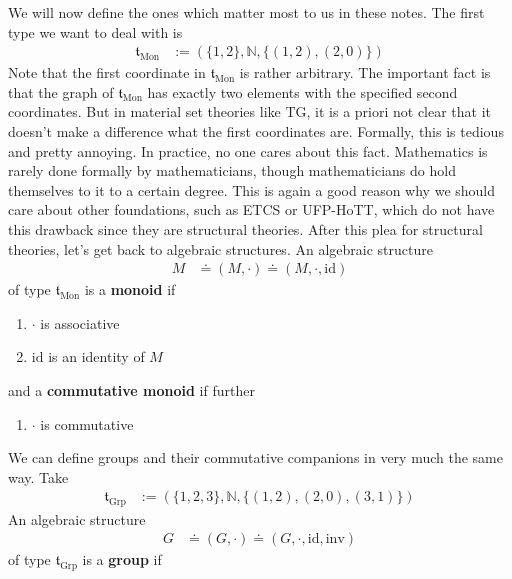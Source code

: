 \begin{exa}
We will now define the ones which matter most to us in these notes.
The first type we want to deal with is
\begin{align*}
  \mathfrak{t}_{\textrm{Mon}}
  &:=
  \left(
    \lbrace
      1,
      2
    \rbrace,
    \mathbb{N},
    \lbrace
      (1,2),
      (2,0)
    \rbrace
  \right)
\end{align*}
Note that the first coordinate in $\mathfrak{t}_{\textrm{Mon}}$ is rather arbitrary.
The important fact is that the graph of $\mathfrak{t}_{\textrm{Mon}}$ has exactly two elements with the specified second coordinates.
But in material set theories like TG, it is a priori not clear that it doesn't make a difference what the first coordinates are.
Formally, this is tedious and pretty annoying.
In practice, no one cares about this fact.
Mathematics is rarely done formally by mathematicians, though mathematicians do hold themselves to it to a certain degree.
This is again a good reason why we should care about other foundations, such as ETCS or UFP-HoTT, which do not have this drawback since they are structural theories.
After this plea for structural theories, let's get back to algebraic structures.
An algebraic structure
\begin{align*}
  M
  &\doteq
  (M,\cdot)
  \doteq
  (M,\cdot,\mathrm{id})
\end{align*}
of type $\mathfrak{t}_{\textrm{Mon}}$ is a \textbf{monoid} if
\begin{enumerate}
\item[(M1)]
$\cdot$ is associative
\item[(M2)]
$\mathrm{id}$ is an identity of $M$
\end{enumerate}
and a \textbf{commutative monoid} if further
\begin{enumerate}
\item[(CM)]
$\cdot$ is commutative
\end{enumerate}
We can define groups and their commutative companions in very much the same way.
Take
\begin{align*}
  \mathfrak{t}_{\textrm{Grp}}
  &:=
  \left(
    \lbrace
      1,
      2,
      3
    \rbrace,
    \mathbb{N},
    \lbrace
      (1,2),
      (2,0),
      (3,1)
    \rbrace
  \right)
\end{align*}
An algebraic structure
\begin{align*}
  G
  &\doteq
  (G,\cdot)
  \doteq
  (G,\cdot,\mathrm{id},\mathrm{inv})
\end{align*}
of type $\mathfrak{t}_{\textrm{Grp}}$ is a \textbf{group} if
\begin{enumerate}

\end{enumerate}
\end{exa}
